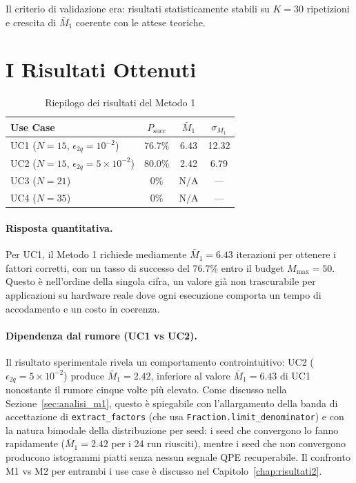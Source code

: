 \begin{onehalfspace}
Il criterio di validazione era: risultati statisticamente stabili su $K=30$ ripetizioni e crescita di $\bar{M}_1$ coerente con le attese teoriche.

\section{I Risultati Ottenuti}
\label{sec:risultati_m1_concl}

\begin{table}[H]
\centering
\caption{Riepilogo dei risultati del Metodo 1}
\label{tab:riepilogo_m1_concl}
\begin{tabular}{lccc}
\hline
\textbf{Use Case} & \textbf{$P_{\text{succ}}$} & \textbf{$\bar{M}_1$} & \textbf{$\sigma_{M_1}$} \\
\hline
UC1 ($N=15$, $\epsilon_{2q}=10^{-2}$) & 76.7\% & 6.43 & 12.32 \\
UC2 ($N=15$, $\epsilon_{2q}=5\times10^{-2}$) & 80.0\% & 2.42 & 6.79 \\
UC3 ($N=21$) & 0\% & N/A & --- \\
UC4 ($N=35$) & 0\% & N/A & --- \\
\hline
\end{tabular}
\end{table}

\paragraph{Risposta quantitativa.}
Per UC1, il Metodo 1 richiede mediamente $\bar{M}_1 = 6.43$ iterazioni per ottenere i fattori corretti, con un tasso di successo del 76.7\% entro il budget $M_{\text{max}} = 50$. Questo è nell'ordine della singola cifra, un valore già non trascurabile per applicazioni su hardware reale dove ogni esecuzione comporta un tempo di accodamento e un costo in coerenza.

\paragraph{Dipendenza dal rumore (UC1 vs UC2).}
Il risultato sperimentale rivela un comportamento controintuitivo: UC2 ($\epsilon_{2q}=5\times10^{-2}$) produce $\bar{M}_1 = 2.42$, inferiore al valore $\bar{M}_1 = 6.43$ di UC1 nonostante il rumore cinque volte più elevato. Come discusso nella Sezione~\ref{sec:analisi_m1}, questo è spiegabile con l'allargamento della banda di accettazione di \texttt{extract\_factors} (che usa \texttt{Fraction.limit\_denominator}) e con la natura bimodale della distribuzione per seed: i seed che convergono lo fanno rapidamente ($\bar{M}_1=2.42$ per i 24 run riusciti), mentre i seed che non convergono producono istogrammi piatti senza nessun segnale QPE recuperabile. Il confronto M1 vs M2 per entrambi i use case è discusso nel Capitolo~\ref{chap:risultati2}.


\end{onehalfspace}

